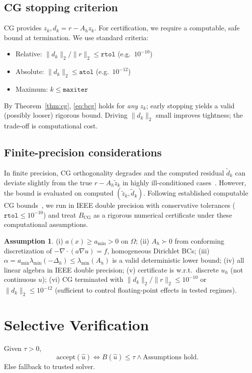 \documentclass[conference]{IEEEtran}
\theoremstyle{plain}
\theoremstyle{definition}
\newtheorem{assumption}{Assumption}
\begin{document}
\subsection{CG stopping criterion}
\label{sec:cg-stop}
CG provides $z_k, d_k=r-A_h z_k$. For certification, we require a computable, safe bound at termination. We use standard criteria:
\begin{itemize}
\item Relative: $\|d_k\|_2 / \|r\|_2 \le \texttt{rtol}$ (e.g.\ $10^{-10}$)
\item Absolute: $\|d_k\|_2 \le \texttt{atol}$ (e.g.\ $10^{-12}$)
\item Maximum: $k \le \texttt{maxiter}$
\end{itemize}
By Theorem~\ref{thm:cg}, \eqref{eq:bcg} holds for \emph{any} $z_k$; early stopping yields a valid (possibly looser) rigorous bound. Driving $\|d_k\|_2$ small improves tightness; the trade-off is computational cost.

\subsection{Finite-precision considerations}
\label{sec:fp}
In finite precision, CG orthogonality degrades and the computed residual $\tilde{d}_k$ can deviate slightly from the true $r-A_h \tilde{z}_k$ in highly ill-conditioned cases~\cite{greenbaum1989behavior,strakos2005error,meurant2006lanczos}. However, the bound is evaluated on computed $(\tilde{z}_k,\tilde{d}_k)$. Following established computable CG bounds~\cite{meurant1999computable,meurant2013accuracy,jiranek2010posteriori}, we run in IEEE double precision with conservative tolerances ($\texttt{rtol}\le 10^{-10}$) and treat $B_{\mathrm{CG}}$ as a rigorous numerical certificate under these computational assumptions.

\begin{assumption}\label{ass:full}
(i) $a(x)\ge a_{\min}>0$ on $\Omega$; (ii) $A_h\succ 0$ from conforming discretization of $-\nabla\cdot(a\nabla u)=f$, homogeneous Dirichlet BCs; (iii) $\alpha=a_{\min}\lambda_{\min}(-\Delta_h)\le \lambda_{\min}(A_h)$ is a valid deterministic lower bound; (iv) all linear algebra in IEEE double precision; (v) certificate is w.r.t.\ discrete $u_h$ (not continuous $u$); (vi) CG terminated with $\|d_k\|_2/\|r\|_2 \le 10^{-10}$ or $\|d_k\|_2\le 10^{-12}$ (sufficient to control floating-point effects in tested regimes).
\end{assumption}

\section{Selective Verification}
\label{sec:selective}
Given $\tau>0$,
\begin{equation}
\text{accept}(\hat{u}) \iff B(\hat{u}) \le \tau \land \text{Assumptions hold}.
\end{equation}
Else fallback to trusted solver.
\end{document}
